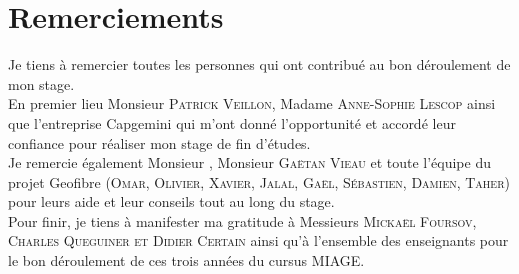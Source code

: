 \chapter*{Remerciements}
\begin{flushright}
Je tiens à remercier toutes les personnes qui ont contribué au bon déroulement de mon stage.
\\En premier lieu Monsieur \textsc{Patrick Veillon}, Madame \textsc{Anne-Sophie Lescop} ainsi que l'entreprise Capgemini
qui m'ont donné l'opportunité et accordé leur confiance pour réaliser mon stage de fin d'études.
\\Je remercie également Monsieur \tex{}, Monsieur \textsc{Gaëtan Vieau} et toute l'équipe du projet Geofibre (\textsc{Omar, Olivier, Xavier, Jalal, Gaël, Sébastien, Damien, Taher}) pour leurs aide et leur conseils tout au long du stage.
\\Pour finir, je tiens à manifester ma gratitude à Messieurs \textsc{Mickaël Foursov, Charles Queguiner et Didier Certain} ainsi qu'à l'ensemble des enseignants pour le bon déroulement de ces trois années du cursus MIAGE.
\end{flushright}
